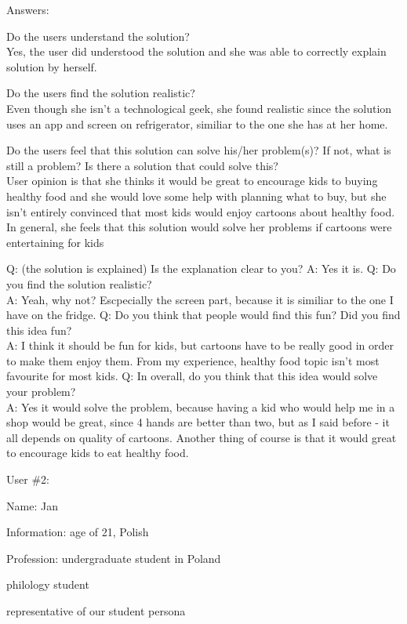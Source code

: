 \documentclass[a4paper,10pt,oneside]{scrreprt}
\begin{document}
Answers:
\begin{compactitem}
	\item Do the users understand the solution?\\
		Yes, the user did understood the solution and she was able to correctly explain solution by herself.\\
	
	\item Do the users find the solution realistic?\\
		Even though she isn't a technological geek, she found realistic since the solution uses an app and screen on refrigerator, similiar to the one she has at her home.\\
		
	\item Do the users feel that this solution can solve his/her problem(s)? If not, what is still
	a problem? Is there a solution that could solve this?\\
		User opinion is that she thinks it would be great to encourage kids to buying healthy food and she would love some help with planning what to buy, 
but she isn't entirely convinced that most kids would enjoy cartoons about healthy food. In general, she feels that this solution would solve her problems
if cartoons were entertaining for kids
\end{compactitem}
\bigskip

Q: (the solution is explained) Is the explanation clear to you?
A: Yes it is.
Q: Do you find the solution realistic?\\
A: Yeah, why not? Escpecially the screen part, because it is similiar to the one I have on the fridge.
Q: Do you think that people would find this fun? Did you find this idea fun?\\
A: I think it should be fun for kids, but cartoons have to be really good in order to make them enjoy them. From my experience,
healthy food topic isn't most favourite for most kids.
Q: In overall, do you think that this idea would solve your problem?\\
A: Yes it would solve the problem, because having a kid who would help me in a shop would be great, since 4 hands are better than two, but as I said before -
it all depends on quality of cartoons. Another thing of course is that it would great to encourage kids to eat healthy food.

\bigskip
\bigskip
User \#2:
\begin{compactitem}
	\item Name: Jan
	\item Information: age of 21, Polish
	\item Profession: undergraduate student in Poland
	\item philology student
	\item representative of our student persona 
\end{compactitem}
\bigskip
\end{document}
